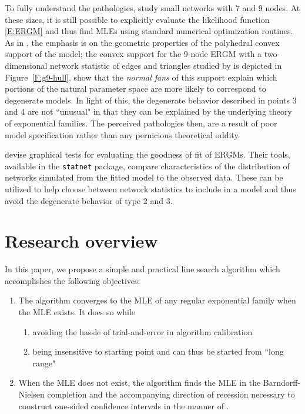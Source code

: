 To fully understand the pathologies, \citeauthor{Handcock:degeneracy,Rinaldo:2009}
study small networks with 7 and 9 nodes.  At these sizes, it is still 
possible to explicitly evaluate the likelihood function \eqref{E:ERGM} and thus 
find MLEs using standard numerical optimization routines.  
As in \citep{Geyer:gdor}, the emphasis is on the geometric properties of the 
polyhedral convex support of the model;
the convex support for the 9-node ERGM with a two-dimensional network statistic of
edges and triangles
studied by \citeauthor{Rinaldo:2009} is depicted in Figure~\ref{F:g9-hull}.
\citeauthor{Rinaldo:2009} show that the \emph{normal fans} of this support 
explain which portions of the natural parameter space are more likely to correspond to 
degenerate models.  In light of this, the degenerate behavior described in 
points 3 and 4 are not ``unusual" in that they can be explained by the underlying
theory of exponential families.  The perceived pathologies then, are a result of 
poor model specification rather than any pernicious theoretical oddity.

\citet*{GOF} devise graphical tests for evaluating the goodness of fit of ERGMs.
Their tools, available in the \texttt{statnet} package, compare characteristics of 
the distribution of networks simulated from the fitted model to the observed data.
These can be utilized to help choose between network statistics to include in a 
model and thus avoid the degenerate behavior of type 2 and 3. 

%


\section{Research overview} \label{S:Research overview}
In this paper, we propose a simple and practical line search algorithm which
accomplishes the following objectives:
\begin{enumerate}
\item The algorithm converges to the MLE of any regular exponential family 
when the MLE exists.  It does so while
\begin{enumerate}
	\item avoiding the hassle of trial-and-error in algorithm calibration
	\item being insensitive to starting point and can thus be started from ``long range"
\end{enumerate}
\item When the MLE does not exist, the algorithm finds the MLE in the Barndorff-Nielsen completion and the 
accompanying direction of recession necessary to construct one-sided 
confidence intervals in the manner of \citep{Geyer:gdor}.
\end{enumerate}

